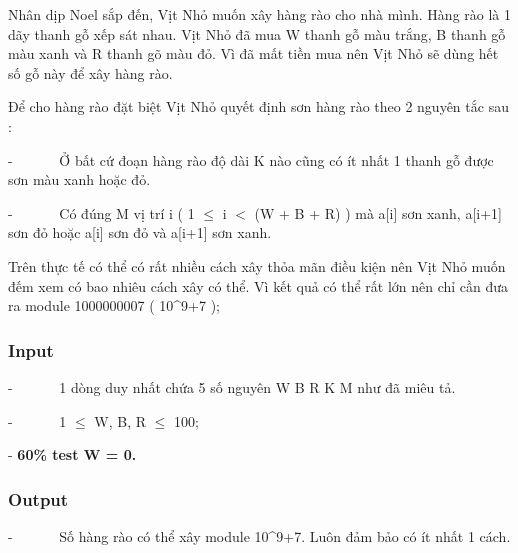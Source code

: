 



   Nhân dịp Noel sắp đến, Vịt Nhỏ muốn xây hàng rào cho nhà mình. Hàng rào là 1 dãy thanh gỗ xếp sát nhau. Vịt Nhỏ đã mua W thanh gỗ màu trắng, B thanh gỗ màu xanh và R thanh gõ màu đỏ. Vì đã mất tiền mua nên Vịt Nhỏ sẽ dùng hết số gỗ này để xây hàng rào.  

   Để cho hàng rào đặt biệt Vịt Nhỏ quyết định sơn hàng rào theo 2 nguyên tắc sau :  

   -       Ở bất cứ đoạn hàng rào độ dài K nào cũng có ít nhất 1 thanh gỗ được sơn màu xanh hoặc đỏ.  

   -       Có đúng M vị trí i ( 1  $\le$  i $<$ (W + B + R) ) mà a[i] sơn xanh, a[i+1] sơn đỏ hoặc a[i] sơn đỏ và a[i+1] sơn xanh.  

   Trên thực tế có thể có rất nhiều cách xây thỏa mãn điều kiện nên Vịt Nhỏ muốn đếm xem có bao nhiêu cách xây có thể. Vì kết quả có thể rất lớn nên chỉ cần đưa ra module 1000000007 ( 10\textasciicircum9+7 );  

\subsubsection{   Input  }

   -       1 dòng duy nhất chứa 5 số nguyên W B R K M như đã miêu tả.  

   -       1  $\le$  W, B, R  $\le$  100;  

   -   \textbf{    60\% test W = 0.   }

\subsubsection{   Output  }

   -       Số hàng rào có thể xây module 10\textasciicircum9+7. Luôn đảm bảo có ít nhất 1 cách.  

